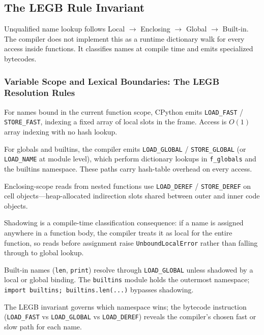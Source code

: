\subsection{The LEGB Rule Invariant}

Unqualified name lookup follows Local $\rightarrow$ Enclosing $\rightarrow$ Global $\rightarrow$ Built-in. The compiler does not implement this as a runtime dictionary walk for every access inside functions. It classifies names at compile time and emits specialized bytecodes.

\subsubsection{Variable Scope and Lexical Boundaries: The LEGB Resolution Rules}

For names bound in the current function scope, CPython emits \texttt{LOAD\_FAST} / \texttt{STORE\_FAST}, indexing a fixed array of local slots in the frame. Access is $O(1)$ array indexing with no hash lookup.

For globals and builtins, the compiler emits \texttt{LOAD\_GLOBAL} / \texttt{STORE\_GLOBAL} (or \texttt{LOAD\_NAME} at module level), which perform dictionary lookups in \texttt{f\_globals} and the builtins namespace. These paths carry hash-table overhead on every access.



Enclosing-scope reads from nested functions use \texttt{LOAD\_DEREF} / \texttt{STORE\_DEREF} on cell objects---heap-allocated indirection slots shared between outer and inner code objects.

Shadowing is a compile-time classification consequence: if a name is assigned anywhere in a function body, the compiler treats it as local for the entire function, so reads before assignment raise \texttt{UnboundLocalError} rather than falling through to global lookup.

Built-in names (\texttt{len}, \texttt{print}) resolve through \texttt{LOAD\_GLOBAL} unless shadowed by a local or global binding. The \texttt{builtins} module holds the outermost namespace; \texttt{import builtins; builtins.len(...)} bypasses shadowing.

The LEGB invariant governs which namespace wins; the bytecode instruction (\texttt{LOAD\_FAST} vs \texttt{LOAD\_GLOBAL} vs \texttt{LOAD\_DEREF}) reveals the compiler's chosen fast or slow path for each name.
